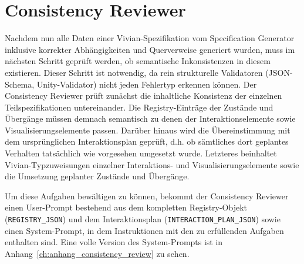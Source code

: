 \section{Consistency Reviewer}\label{sec:consistency_reviewer}

Nachdem nun alle Daten einer Vivian-Spezifikation vom Specification Generator inklusive korrekter Abhängigkeiten und Querverweise generiert wurden, muss im nächsten Schritt geprüft werden, ob semantische Inkonsistenzen in diesem existieren. Dieser Schritt ist notwendig, da rein strukturelle Validatoren (JSON-Schema, Unity-Validator) nicht jeden Fehlertyp erkennen können. Der Consistency Reviewer prüft zunächst die inhaltliche Konsistenz der einzelnen Teilspezifikationen untereinander. Die Registry-Einträge der Zustände und Übergänge müssen demnach semantisch zu denen der Interaktionselemente sowie Visualisierungselemente passen. Darüber hinaus wird die Übereinstimmung mit dem ursprünglichen Interaktionsplan geprüft, d.h. ob sämtliches dort geplantes Verhalten tatsächlich wie vorgesehen umgesetzt wurde. Letzteres beinhaltet Vivian-Typzuweisungen einzelner Interaktions- und Visualisierungselemente sowie die Umsetzung geplanter Zustände und Übergänge.

Um diese Aufgaben bewältigen zu können, bekommt der Consistency Reviewer einen User-Prompt bestehend aus dem kompletten Registry-Objekt (\texttt{REGISTRY\_JSON}) und dem Interaktionsplan (\texttt{INTERACTION\_PLAN\_JSON}) sowie einen System-Prompt, in dem Instruktionen mit den zu erfüllenden Aufgaben enthalten sind. Eine volle Version des System-Prompts ist in Anhang~\ref{ch:anhang_consistency_review} zu sehen.

